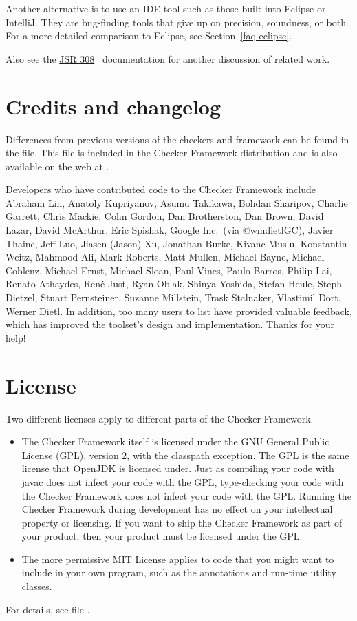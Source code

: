 Another alternative is to use an IDE tool such as those built into Eclipse
or IntelliJ\@.  They are bug-finding tools that give up on precision,
soundness, or both.
For a more detailed comparison to Eclipse, see Section~\ref{faq-eclipse}.

Also see the
\href{https://checkerframework.org/jsr308/}{JSR 308}~\cite{JSR308-2008-09-12}
documentation for another discussion of related work.


\section{Credits and changelog\label{credits}}

Differences from previous versions of the checkers and framework can be found
in the  file.  This file is included in the
Checker Framework distribution and is also available on the web at
.

Developers who have contributed code to the Checker Framework include
%
Abraham Lin,
Anatoly Kupriyanov,
Asumu Takikawa,
Bohdan Sharipov,
Charlie Garrett,
Chris Mackie,
Colin Gordon,
Dan Brotherston,
Dan Brown,
David Lazar,
David McArthur,
Eric Spishak,
Google Inc.\ (via @wmdietlGC),
Javier Thaine,
Jeff Luo,
Jiasen (Jason) Xu,
Jonathan Burke,
Kivanc Muslu,
Konstantin Weitz,
Mahmood Ali,
Mark Roberts,
Matt Mullen,
Michael Bayne,
Michael Coblenz,
Michael Ernst,
Michael Sloan,
Paul Vines,
Paulo Barros,
Philip Lai,
Renato Athaydes,
Ren\'e Just,
Ryan Oblak,
Shinya Yoshida,
Stefan Heule,
Steph Dietzel,
Stuart Pernsteiner,
Suzanne Millstein,
Trask Stalnaker,
Vlastimil Dort,
Werner Dietl.
%
In addition, too many users to list have provided valuable feedback, which
has improved the toolset's design and implementation.
Thanks for your help!


\section{License\label{license}}

Two different licenses apply to different parts of the Checker Framework.
\begin{itemize}
\item
The Checker Framework itself is licensed under the GNU General Public License
(GPL), version 2, with the classpath exception.
The GPL is the same license that OpenJDK is licensed
under.  Just as compiling your code with javac does not infect your code
with the GPL, type-checking your code with the Checker Framework does not
infect your code with the GPL\@.  Running the Checker Framework during
development has no effect on your intellectual property or licensing.  If
you want to ship the Checker Framework as part of your product, then your
product must be licensed under the GPL\@.
\item
The more permissive MIT License applies
to code that you might want to include in your own
program, such as the annotations and run-time utility classes.
\end{itemize}
\noindent
For details, see file
.



